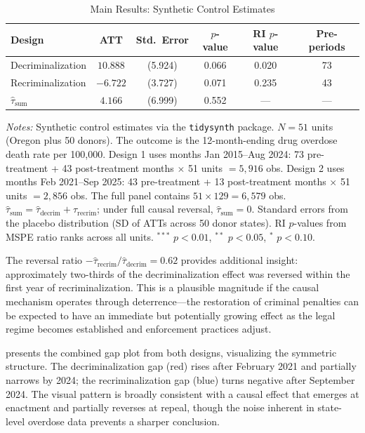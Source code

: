 \documentclass[12pt]{article}
\begin{document}
\begin{table}[H]
\centering
\caption{Main Results: Synthetic Control Estimates}
\label{tab:main}
\begin{threeparttable}
\begin{tabular}{lccccc}
\toprule
Design & ATT & Std.~Error & $p$-value & RI $p$-value & Pre-periods \\
\midrule
Decriminalization & $10.888$ & (5.924) & 0.066 & 0.020 & 73 \\
Recriminalization & $-6.722$ & (3.727) & 0.071 & 0.235 & 43 \\
\midrule
$\hat{\tau}_{\text{sum}}$ & $4.166$ & (6.999) & 0.552 & --- & --- \\
\bottomrule
\end{tabular}
\begin{tablenotes}[flushleft]
\small
\item \textit{Notes:} Synthetic control estimates \citep{abadie2010synthetic} via the \texttt{tidysynth} package. $N = 51$ units (Oregon plus 50 donors). The outcome is the 12-month-ending drug overdose death rate per 100,000. Design 1 uses months Jan 2015--Aug 2024: 73 pre-treatment + 43 post-treatment months $\times$ 51 units $= 5{,}916$ obs. Design 2 uses months Feb 2021--Sep 2025: 43 pre-treatment + 13 post-treatment months $\times$ 51 units $= 2{,}856$ obs. The full panel contains $51 \times 129 = 6{,}579$ obs. $\hat{\tau}_{\text{sum}} = \hat{\tau}_{\text{decrim}} + \hat{\tau}_{\text{recrim}}$; under full causal reversal, $\hat{\tau}_{\text{sum}} = 0$. Standard errors from the placebo distribution (SD of ATTs across 50 donor states). RI $p$-values from MSPE ratio ranks across all units. $^{***}$ $p<0.01$, $^{**}$ $p<0.05$, $^{*}$ $p<0.10$.
\end{tablenotes}
\end{threeparttable}
\end{table}

The reversal ratio $-\hat{\tau}_{\text{recrim}} / \hat{\tau}_{\text{decrim}} = 0.62$ provides additional insight: approximately two-thirds of the decriminalization effect was reversed within the first year of recriminalization. This is a plausible magnitude if the causal mechanism operates through deterrence---the restoration of criminal penalties can be expected to have an immediate but potentially growing effect as the legal regime becomes established and enforcement practices adjust.

 presents the combined gap plot from both designs, visualizing the symmetric structure. The decriminalization gap (red) rises after February 2021 and partially narrows by 2024; the recriminalization gap (blue) turns negative after September 2024. The visual pattern is broadly consistent with a causal effect that emerges at enactment and partially reverses at repeal, though the noise inherent in state-level overdose data prevents a sharper conclusion.
\end{document}
